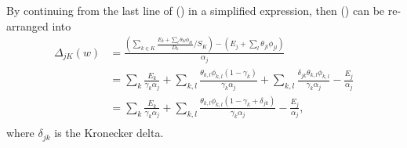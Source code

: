 \documentclass[12pt]{article}
\def\D{\displaystyle}
\begin{document}
By continuing from the last line of () in a simplified expression, then () can be re-arranged into
\begin{equation}
    \label{eq:delta_split}
    \begin{split}
        \Delta_{jK}(w)&= \frac{\D \left(\sum_{k\in K} \frac{E_k + \sum_l \theta_{kl} \phi_{kl}}{D_k} / S_K\right) - \left(E_j + \sum_l \theta_{jl} \phi_{jl}\right)}{\alpha_j} \\
        &= \sum_k \frac{E_k}{\gamma_k\alpha_j} + \sum_{k,l} \frac{\theta_{k,l} \phi_{k,l} (1-\gamma_k)}{\gamma_k\alpha_j} +  \sum_{k,l} \frac{\delta_{jk}\theta_{k,l} \phi_{k,l}}{\gamma_k\alpha_j} - \frac{E_j}{\alpha_j}\\
        &= \sum_k \frac{E_k}{\gamma_k\alpha_j} + \sum_{k,l} \frac{\theta_{k,l} \phi_{k,l} (1-\gamma_k + \delta_{jk})}{\gamma_k\alpha_j} - \frac{E_j}{\alpha_j}, \\
    \end{split}
\end{equation}
where $\delta_{jk}$ is the Kronecker delta.
\iffalse
In order to see the general pattern of (\refeq{eq:delta}), let us see a simple example with $j = 1$, $|K| = 2$, and $L = 2$; and using simplified expressions by omitting the arguments
\begin{equation*}
    \begin{split}
        D_k &:= D_k(w), \\
        S_K &:= S_K(w), \\
        \phi_{k,l} &:= \phi_{k,l}(w),
    \end{split}
\end{equation*}
hence
\begin{equation}
    \begin{split}
        \Delta_{1,K}(w)&:= \frac{\D \frac{ E_1 + \theta_{1,1}\phi_{1,1} + \theta_{1,2}\phi_{1,2}}{D_1S_K} + \frac{E_2 + \theta_{2,1}\phi_{2,1} + \theta_{2,2}\phi_{2,2}}{D_2S_K} - (E_1 + \theta_{1,1}\phi_{1,1} + \theta_{1,2}\phi_{1,2})}{D_1S_K-1} \\
        &= \D \frac{ E_1 + \theta_{1,1}\phi_{1,1} + \theta_{1,2}\phi_{1,2}}{D_1S_K(D_1S_K-1)} + \frac{E_2 + \theta_{2,1}\phi_{2,1} + \theta_{2,2}\phi_{2,2}}{D_2S_K(D_1S_K-1)} - \frac{(E_1 + \theta_{1,1}\phi_{1,1} + \theta_{1,2}\phi_{1,2})}{D_1S_K-1} \\
        &= \dots
    \end{split}
\end{equation}
\fi
\end{document}
